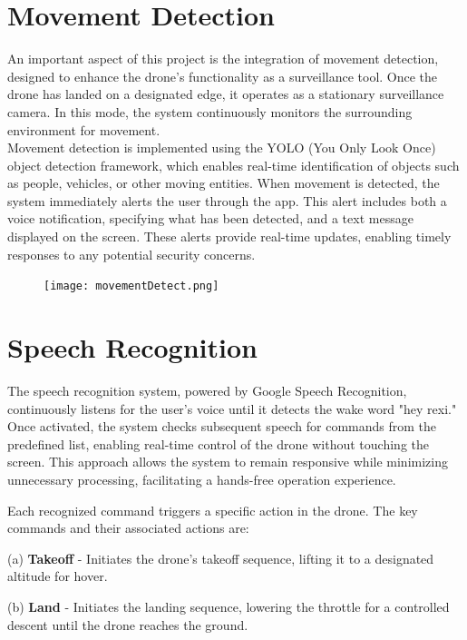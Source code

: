 \documentclass[unnumsec,webpdf,modern,large]{mam-authoring-template}%
\begin{document}
\section{Movement Detection}
An important aspect of this project is the integration of movement detection, designed to enhance the drone’s functionality as a surveillance tool. Once the drone has landed on a designated edge, it operates as a stationary surveillance camera. In this mode, the system continuously monitors the surrounding environment for movement.\\
Movement detection is implemented using the YOLO (You Only Look Once) object detection framework, which enables real-time identification of objects such as people, vehicles, or other moving entities. When movement is detected, the system immediately alerts the user through the app. This alert includes both a voice notification, specifying what has been detected, and a text message displayed on the screen. These alerts provide real-time updates, enabling timely responses to any potential security concerns.

\begin{figure}[H]
    \centering
    \texttt{[image: movementDetect.png]}  %
    \label{fig:movementDetect.}
\end{figure}

\section{Speech Recognition} \label{sec:SpeechRecognition}
The speech recognition system, powered by Google Speech Recognition, continuously listens for the user’s voice until it detects the wake word "hey rexi." Once activated, the system checks subsequent speech for commands from the predefined list, enabling real-time control of the drone without touching the screen. This approach allows the system to remain responsive while minimizing unnecessary processing, facilitating a hands-free operation experience.

Each recognized command triggers a specific action in the drone. The key commands and their associated actions are:

(a) \textbf{Takeoff} - Initiates the drone's takeoff sequence, lifting it to a designated altitude for hover.

(b) \textbf{Land} - Initiates the landing sequence, lowering the throttle for a controlled descent until the drone reaches the ground.
\end{document}
